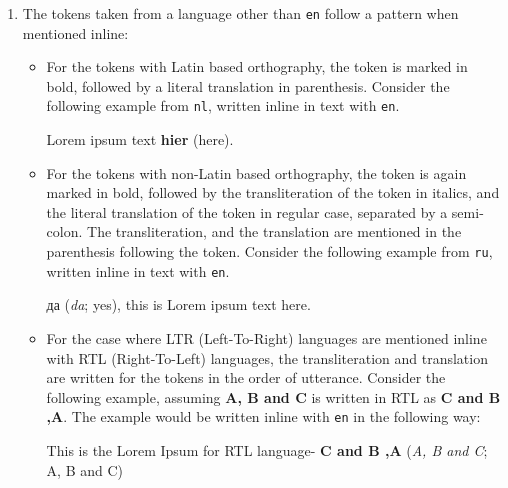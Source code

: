 \begin{enumerate}
    \item The tokens taken from a language other than \verb|en| follow a pattern when mentioned inline:
    \begin{itemize}
        \item For the tokens with Latin based orthography, the token is marked in bold, followed by a literal translation in parenthesis. Consider the following example from \verb|nl|, written inline in text with \verb|en|.
        \begin{example}
            Lorem ipsum text \textbf{hier} (here).
        \end{example}
        \item For the tokens with non-Latin based orthography, the token is again marked in bold, followed by the transliteration of the token in italics, and the literal translation of the token in regular case, separated by a semi-colon. The transliteration, and the translation are mentioned in the parenthesis following the token. Consider the following example from \verb|ru|, written inline in text with \verb|en|.
        \begin{example}
            \textrussian{да} (\textit{da}; yes), this is Lorem ipsum text here.
        \end{example}
        \item For the case where LTR (Left-To-Right) languages are mentioned inline with RTL (Right-To-Left) languages, the transliteration and translation are written for the tokens in the order of utterance. Consider the following example, assuming \textbf{A, B and C} is written in RTL as \textbf{C and B ,A}. The example would be written inline with \verb|en| in the following way:
        \begin{example}
            This is the Lorem Ipsum for RTL language- \textbf{C and B ,A} (\textit{A, B and C}; A, B and C)
        \end{example}
    \end{itemize}
    
\end{enumerate}